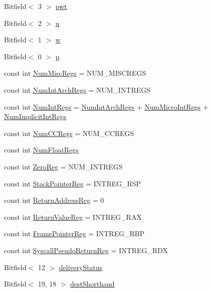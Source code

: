\begin{DoxyCompactItemize}
\item 
Bitfield$<$ 3 $>$ \hyperlink{namespaceX86ISA_a7d9189c8341eb49a548265b9e2a63016}{pwt}
\item 
Bitfield$<$ 2 $>$ \hyperlink{namespaceX86ISA_a7e3784c7f43527cd11c233c019f2937e}{u}
\item 
Bitfield$<$ 1 $>$ \hyperlink{namespaceX86ISA_ad99fa3b4cc4da86ab4f09dbadd5048af}{w}
\item 
Bitfield$<$ 0 $>$ \hyperlink{namespaceX86ISA_af675c1d542a25b96e11164b80809a856}{p}
\item 
const int \hyperlink{namespaceX86ISA_a568d4aa96dd7cd963f3b1b1b0446c9c6}{NumMiscRegs} = NUM\_\-MISCREGS
\item 
const int \hyperlink{namespaceX86ISA_a405c0abe85dc0da846c120e3b31f375c}{NumIntArchRegs} = NUM\_\-INTREGS
\item 
const int \hyperlink{namespaceX86ISA_a9c412b5118ce369570c156c4e156638a}{NumIntRegs} = \hyperlink{namespaceX86ISA_a405c0abe85dc0da846c120e3b31f375c}{NumIntArchRegs} + \hyperlink{namespaceX86ISA_a985912475a96ec00a4ff48b39004d43a}{NumMicroIntRegs} + \hyperlink{namespaceX86ISA_a7e051dc96074ceadda53ac54735a2181}{NumImplicitIntRegs}
\item 
const int \hyperlink{namespaceX86ISA_a717317b863009b3e1b683c3bdddb9fd3}{NumCCRegs} = NUM\_\-CCREGS
\item 
const int \hyperlink{namespaceX86ISA_a627b25288f2452be107872a138df8b85}{NumFloatRegs}
\item 
const int \hyperlink{namespaceX86ISA_a33dbba4a12f6733a5ecc2d2b3542b7ee}{ZeroReg} = NUM\_\-INTREGS
\item 
const int \hyperlink{namespaceX86ISA_a95d0846360ad0e64cb42fda7268a6434}{StackPointerReg} = INTREG\_\-RSP
\item 
const int \hyperlink{namespaceX86ISA_a99ba4a35fbf9debeb1f7ddb1db7b9967}{ReturnAddressReg} = 0
\item 
const int \hyperlink{namespaceX86ISA_a472eedbcba9726645062b921f8d07e98}{ReturnValueReg} = INTREG\_\-RAX
\item 
const int \hyperlink{namespaceX86ISA_aabd6fa5889c9ccc124dfd4a984046f6f}{FramePointerReg} = INTREG\_\-RBP
\item 
const int \hyperlink{namespaceX86ISA_ab566b6da98edbb32e80291edaf0906ba}{SyscallPseudoReturnReg} = INTREG\_\-RDX
\item 
Bitfield$<$ 12 $>$ \hyperlink{namespaceX86ISA_abe55336004f210f2b2c0421f55ea7c3e}{deliveryStatus}
\item 
Bitfield$<$ 19, 18 $>$ \hyperlink{namespaceX86ISA_a4b961bdf11c0bc3384446cb6b52a09fe}{destShorthand}

\end{DoxyCompactItemize}
